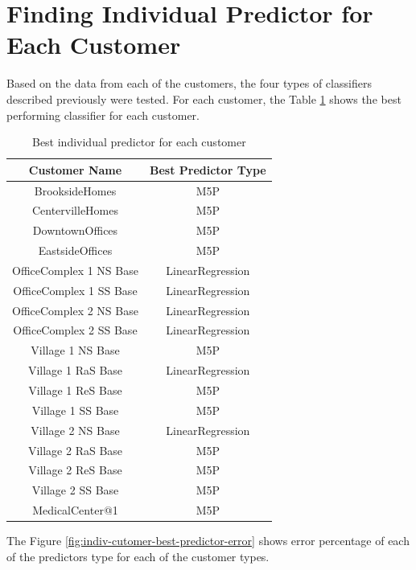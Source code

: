\section{Finding Individual Predictor for Each Customer}
Based on the data from each of the customers, the four types of classifiers described previously were tested. For each customer, the Table \ref{table:1} shows the best performing classifier for each customer. 

\begin{table}[h!]
\centering
\caption{Best individual predictor for each customer}
\begin{tabular}{|c| c|} 
 \hline
 Customer Name & Best Predictor Type \\ [0.5ex] 
 \hline
BrooksideHomes &	M5P \\
CentervilleHomes &	M5P \\
DowntownOffices &	M5P \\
EastsideOffices &	M5P \\
OfficeComplex 1 NS Base &	LinearRegression \\
OfficeComplex 1 SS Base &	LinearRegression \\
OfficeComplex 2 NS Base &	LinearRegression \\
OfficeComplex 2 SS Base &	LinearRegression \\
Village 1 NS Base &	M5P \\
Village 1 RaS Base &	LinearRegression \\
Village 1 ReS Base &	M5P \\
Village 1 SS Base &	M5P \\
Village 2 NS Base &	LinearRegression \\
Village 2 RaS Base &	M5P \\
Village 2 ReS Base &	M5P \\
Village 2 SS Base &	M5P \\
MedicalCenter@1	& M5P \\ [1ex] 
 \hline
\end{tabular}
\label{table:1}
\end{table}

The Figure \ref{fig:indiv-cutomer-best-predictor-error} shows error percentage of each of the predictors type for each of the customer types.

